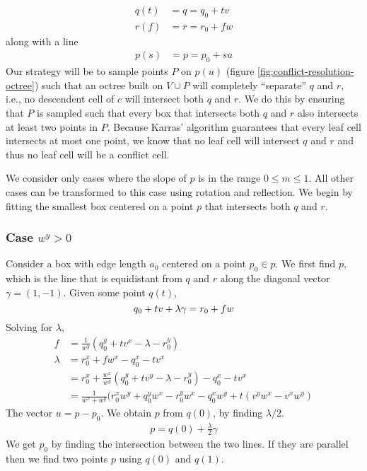\documentclass{egpubl}
\begin{document}
\begin{align}
q(t) &= q = q_0 + tv \label{eqn:q} \\
r(f) &= r = r_0 + fw \label{eqn:r}
\end{align}
along with a line
\begin{align}
p(s) &= p = p_0 + su \label{eqn:p}
\end{align}
Our strategy will be to sample points $P$ on $p(u)$ (figure \ref{fig:conflict-resolution-octree}) such that an octree built on $V \cup P$ will completely ``separate'' $q$ and $r$, i.e., no descendent cell of $c$ will intersect both $q$ and $r$. We do this by ensuring that $P$ is sampled such that every box that intersects both $q$ and $r$ also intersects at least two points in $P$. Because Karras' algorithm guarantees that every leaf cell intersects at most one point, we know that no leaf cell will intersect $q$ and $r$ and thus no leaf cell will be a conflict cell.

We consider only cases where the slope of $p$ is in the range $0 \le m \le 1$. All other cases can be transformed to this case using rotation and reflection. We begin by fitting the smallest box centered on a point $p$ that intersects both $q$ and $r$.

\subsubsection{Case $w^y>0$}

Consider a box with edge length $a_0$ centered on a point $p_0 \in p$. We first find $p$, which is the line that is equidistant from $q$ and $r$ along the diagonal vector $\gamma = (1, -1)$. Given some point $q(t)$,
\begin{equation}
q_0+tv + \lambda\gamma = r_0+fw \\
\end{equation}
Solving for $\lambda$,
\begin{align}
f &= \frac{1}{w^y}(q_0^y+tv^x-\lambda-r_0^y) \\
\lambda &= r_0^x + fw^x-q_0^x-tv^x \\
        &= r_0^x+\frac{w^x}{w^y}(q_0^y+tv^y-\lambda-r_0^y) - q_0^x-tv^x \\
        &= \frac{1}{w^x+w^y}(r_0^xw^y+q_0^yw^x-r_0^yw^x-q_0^xw^y+t(v^yw^x-v^xw^y)
\end{align}
The vector $u = p - p_0$. We obtain $p$ from $q(0)$, by finding $\lambda/2$.
\begin{align}
p = q(0) + \frac{\lambda}{2}\gamma
\end{align}
We get $p_0$ by finding the intersection between the two lines. If they are parallel then we find two points $p$ using $q(0)$ and $q(1)$.
\end{document}
